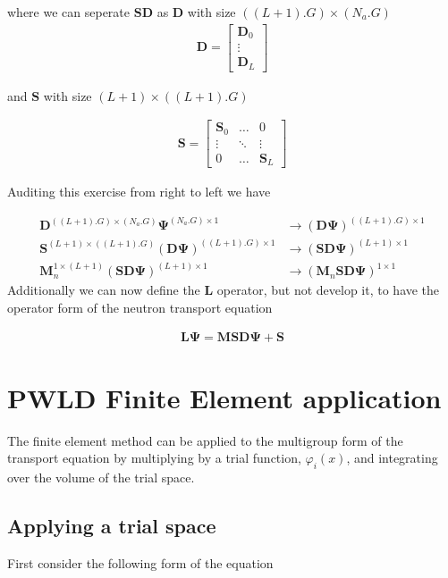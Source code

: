 \documentclass[11pt,letterpaper,titlepage]{article}
\newcommand{\stimes}{{\times}}
\numberwithin{equation}{section}
\newcommand{\beq}{\begin{equation*}
\begin{aligned}}
\newcommand{\eeq}{\end{aligned}
\end{equation*}}
\newcommand{\beqn}{\begin{equation}
	\begin{aligned}}
\newcommand{\eeqn}{\end{aligned}
	\end{equation}}
\begin{document}
where we can seperate $\mathbf{SD}$ as $\mathbf{D}$ with size $((L+1).G)\stimes (N_a . G)$
\beq 
\mathbf{D}  = 
\begin{bmatrix}
\mathbf{D}_0 \\
\vdots \\
\mathbf{D}_L
\end{bmatrix}
\eeq 

and $\mathbf{S}$ with size $(L+1) \stimes ((L+1).G)$

\beq
\mathbf{S}= 
\begin{bmatrix}
\mathbf{S}_0     &\hdots &0 \\
\vdots               &\ddots &\vdots \\
0                      &\hdots &\mathbf{S}_L
\end{bmatrix}
\eeq 

Auditing this exercise from right to left we have

\beq 
\mathbf{D}^{((L+1) .G)\stimes (N_a . G)}    \mathbf{\Psi}^{(N_a.G) \stimes 1}
&\to (\mathbf{D\Psi })^{((L+1) .G)\stimes 1} \\
\mathbf{S}^{(L+1)  \stimes ((L+1) .G)}(\mathbf{D\Psi })^{((L+1) .G)\stimes 1} 
&\to (\mathbf{SD\Psi})^{(L+1) \stimes 1} \\
\mathbf{M}_n^{1\stimes (L+1)}(\mathbf{SD\Psi})^{(L+1) \stimes 1} 
&\to (\mathbf{M}_n \mathbf{SD\Psi})^{1\stimes 1}
\eeq 
\newline
Additionally we can now define the $\mathbf{L}$ operator, but not develop it, to have the operator form of the neutron transport equation

\beqn \label{eq:NTEoperatorform}
\mathbf{L \Psi} = \mathbf{MSD\Psi} + \mathbf{S}
\eeqn 








\newpage
\section{PWLD Finite Element application}
The finite element method can be applied to the multigroup form of the transport equation by multiplying by a trial function, $\varphi_i(x)$, and integrating over the volume of the trial space. 

\subsection{Applying a trial space}

First consider the following form of the equation
\end{document}
